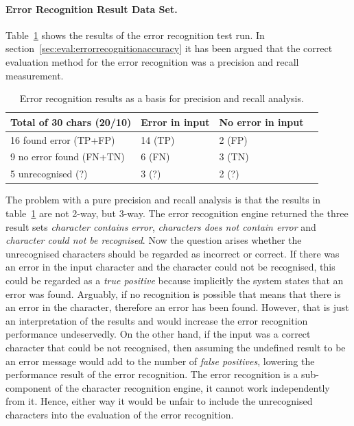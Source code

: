 \paragraph{Error Recognition Result Data Set.}
Table~\ref{table:eval:resultsprecisionandrecallnumbers} shows the results 
of the error recognition test run. 
In section~\ref{sec:eval:errorrecognitionaccuracy} it has been argued that the
correct evaluation method for the error recognition was a precision and recall
measurement.
\begin{table}[htbp]
\begin{center}
  \begin{tabular}{|l|l|l|p{200pt}|}
    \hline
    Total of 30 chars (20/10) & Error in input      & No error in input \\
    \hline
    16 found error (TP+FP)    & 14 (TP)             & 2 (FP) \\
    \hline
    9 no error found (FN+TN)  & 6 (FN)              & 3 (TN) \\
    \hline
    5 unrecognised (?)        & 3 (?)               & 2 (?) \\
    \hline
  \end{tabular}
\end{center}
\caption{Error recognition results as a basis for precision and recall analysis.}
\label{table:eval:resultsprecisionandrecallnumbers}
\end{table}
The problem with a pure precision and recall analysis is that the results
in table~\ref{table:eval:resultsprecisionandrecallnumbers} are not 2-way, 
but 3-way. The error recognition engine returned the three result sets 
\emph{character contains error}, \emph{characters does not contain error}
and \emph{character could not be recognised}.
Now the question arises whether the unrecognised characters should be 
regarded as incorrect or correct. 
If there was an error in the input character and the character could 
not be recognised, this could be regarded as a \emph{true positive}
because implicitly the system states that an error was found.
Arguably, if no recognition is possible that means that there is an 
error in the character, therefore an error has been found.
However, that is just an interpretation of the results and
would increase the error recognition performance undeservedly. 
On the other hand, if the input was a correct character that 
could be not recognised, then assuming the undefined result to be an error 
message would add to the number of \emph{false positives}, 
lowering the performance result of the error recognition.
The error recognition is a sub-component of the character recognition engine,
it cannot work independently from it. 
Hence, either way it would be unfair to include the unrecognised
characters into the evaluation of the error recognition.

